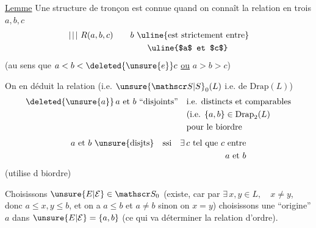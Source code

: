 \uline{Lemme} Une structure de  tronçon  est connue quand on connaît la relation en  trois  $a,b,c$
\[
\begin{aligned}
\left.\vphantom{\substack{X\\X}}\right|\!\left.\vphantom{\substack{X\\X}}\right|\!\left.\vphantom{\substack{X\\X}}\right|\, R(a,b,c)
&\qquad b\ \text{\uline{est strictement entre}}\\
&\qquad\qquad\text{\uline{$a$ et $c$}}
\end{aligned}
\]
(au sens que $a<b<\deleted{\unsure{e}}c$ \uline{ou} $a>b>c$)

\uline{}  On en déduit la relation (i.e.  $\unsure{\mathscr S|S}_0(L)$\deleted{\unsure{)}} i.e. de $\mathrm{Drap}(L)$)
\[
\begin{aligned}
\deleted{\unsure{a}}\,a\text{ et }b\ \text{``disjoints''}\quad&
\text{i.e. distincts et comparables}\\
&\text{(i.e. }\{a,b\}\in\mathrm{Drap}_2(L)\\
&\text{pour le biordre}
\end{aligned}
\]
\[
\begin{aligned}
a\text{ et }b\ \text{\unsure{disjts}}\quad \text{ssi}\quad
\exists\,c\ \text{tel que }c\text{ entre}\\
a\text{ et }b
\end{aligned}
\]
(utilise  d  biordre)

 Choisissons $\unsure{E|\mathcal E}\in\mathscr S_0$ (existe, car  par  $\exists\,x,y\in L,\quad x\ne y$, donc $a\leq x,y\leq b$, et on a $a\leq b$ et $a\ne b$ \deleted{\unsure{)}}  sinon on  $x=y$)
 choisissons une ``origine'' $a$ dans $\unsure{E|\mathcal E}=\{a,b\}$ (ce qui va déterminer la relation d'ordre).

